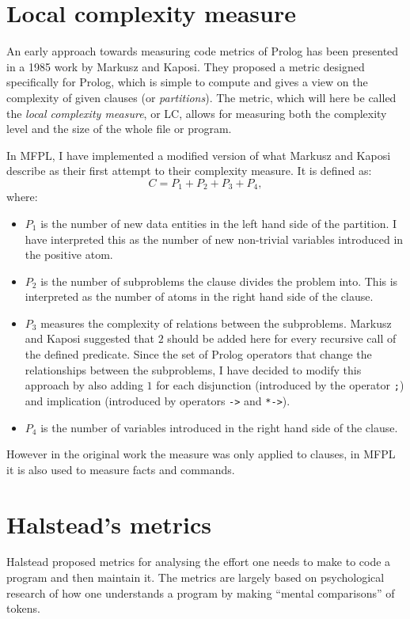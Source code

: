 \documentclass[11pt,a4paper,twoside]{article}
\begin{document}
\begin{multicols}{2}
\section{Local complexity measure}

An early approach towards measuring code metrics of Prolog has been
presented in a 1985 work by Markusz and Kaposi\cite{markusz}. They
proposed a metric designed specifically for Prolog, which is simple to
compute and gives a view on the complexity of given clauses (or
\emph{partitions}). The metric, which will here be called the
\emph{local complexity measure}, or LC, allows for measuring both the
complexity level and the size of the whole file or program.

In MFPL, I have implemented a modified version of what Markusz and
Kaposi describe as their first attempt to their complexity measure. 
It is defined as:
$$ C = P_1 + P_2 + P_3 + P_4, $$
where:
\begin{itemize}
\item $P_1$ is the number of new data entities in the left hand side
  of the partition. I have interpreted this as the number of new
  non-trivial variables introduced in the positive atom.
\item $P_2$ is the number of subproblems the clause divides the
  problem into. This is interpreted as the number of atoms in the
  right hand side of the clause.
\item $P_3$ measures the complexity of relations between the
  subproblems. Markusz and Kaposi suggested that $2$ should be added
  here for every recursive call of the defined predicate. Since the
  set of Prolog operators that change the relationships between the
  subproblems, I have decided to modify this approach by also adding
  $1$ for each disjunction (introduced by the operator \texttt{;}) and
  implication (introduced by operators \texttt{->} and
  \texttt{*->}).
\item $P_4$ is the number of variables introduced in the right hand
  side of the clause.
\end{itemize}
However in the original work the measure was only applied to clauses, 
in MFPL it is also used to measure facts and commands. 

\section{Halstead's metrics}

Halstead \cite{halstead} proposed metrics for analysing the effort one
needs to make to code a program and then maintain it. The metrics are
largely based on psychological research of how one understands a
program by making ``mental comparisons'' of tokens.


\end{multicols}
\end{document}

